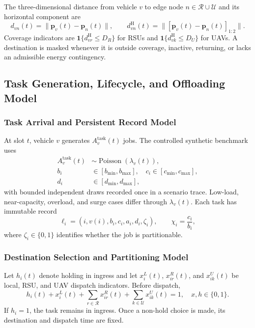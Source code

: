 \documentclass[journal]{IEEEtran}
\begin{document}
The three-dimensional distance from vehicle $v$ to edge node
$n\in\mathcal R\cup\mathcal U$ and its horizontal component are
\begin{equation}
d_{vn}(t)=\|\boldsymbol p_v(t)-\boldsymbol p_n(t)\|,\qquad
d_{vn}^{\mathrm H}(t)=
\|[\boldsymbol p_v(t)-\boldsymbol p_n(t)]_{1:2}\|.
\label{eq:distances}
\end{equation}
Coverage indicators are
$\mathbf 1\{d_{vr}^{\mathrm H}\le D_R\}$ for RSUs and
$\mathbf 1\{d_{vk}^{\mathrm H}\le D_U\}$ for UAVs.  A destination is
masked whenever it is outside coverage, inactive, returning, or lacks
an admissible energy contingency.

\subsection{Task Generation, Lifecycle, and Offloading Model}
\label{subsec:task_model}
\subsubsection{Task Arrival and Persistent Record Model}
At slot $t$, vehicle $v$ generates $A_v^{\mathrm{task}}(t)$ jobs.  The
controlled synthetic benchmark uses
\begin{equation}
\begin{aligned}
A_v^{\mathrm{task}}(t)&\sim
\operatorname{Poisson}(\lambda_v(t)),\\
b_i&\in[b_{\min},b_{\max}],\quad
c_i\in[c_{\min},c_{\max}],\\
d_i&\in[d_{\min},d_{\max}],
\end{aligned}
\label{eq:task_arrival}
\end{equation}
with bounded independent draws recorded once in a scenario trace.
Low-load, near-capacity, overload, and surge cases differ through
$\lambda_v(t)$.  Each task has immutable record
\begin{equation}
\ell_i=(i,v(i),b_i,c_i,a_i,d_i,\zeta_i),\qquad
\chi_i=\frac{c_i}{b_i},
\label{eq:task_record}
\end{equation}
where $\zeta_i\in\{0,1\}$ identifies whether the job is partitionable.

\subsubsection{Destination Selection and Partitioning Model}
Let $h_i(t)$ denote holding in ingress and let $x_i^L(t)$,
$x_{ir}^R(t)$, and $x_{ik}^U(t)$ be local, RSU, and UAV dispatch
indicators.  Before dispatch,
\begin{equation}
h_i(t)+x_i^L(t)+\sum_{r\in\mathcal R}x_{ir}^R(t)
 +\sum_{k\in\mathcal U}x_{ik}^U(t)=1,
\quad x,h\in\{0,1\}.
\label{eq:destination}
\end{equation}
If $h_i=1$, the task remains in ingress.  Once a non-hold choice is
made, its destination and dispatch time are fixed.
\end{document}
